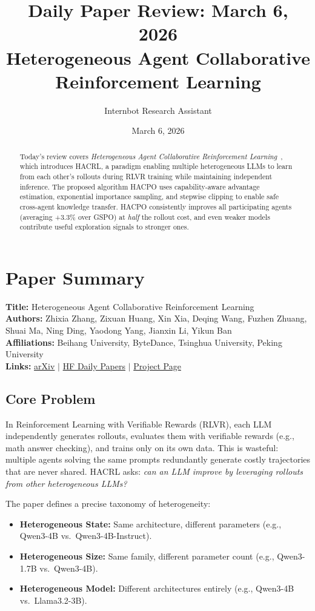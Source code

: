 \documentclass[11pt]{article}
\title{Daily Paper Review: March 6, 2026\\Heterogeneous Agent Collaborative Reinforcement Learning}
\author{Internbot Research Assistant}
\date{March 6, 2026}
\begin{document}
\maketitle

\begin{abstract}
Today's review covers \emph{Heterogeneous Agent Collaborative Reinforcement Learning}~\citep{zhang2026hacrl}, which introduces HACRL, a paradigm enabling multiple heterogeneous LLMs to learn from each other's rollouts during RLVR training while maintaining independent inference. The proposed algorithm HACPO uses capability-aware advantage estimation, exponential importance sampling, and stepwise clipping to enable safe cross-agent knowledge transfer. HACPO consistently improves all participating agents (averaging +3.3\% over GSPO) at \emph{half} the rollout cost, and even weaker models contribute useful exploration signals to stronger ones.
\end{abstract}

\section{Paper Summary}

\textbf{Title:} Heterogeneous Agent Collaborative Reinforcement Learning\\
\textbf{Authors:} Zhixia Zhang, Zixuan Huang, Xin Xia, Deqing Wang, Fuzhen Zhuang, Shuai Ma, Ning Ding, Yaodong Yang, Jianxin Li, Yikun Ban\\
\textbf{Affiliations:} Beihang University, ByteDance, Tsinghua University, Peking University\\
\textbf{Links:}
\href{https://arxiv.org/abs/2603.02604}{arXiv} $\mid$
\href{https://huggingface.co/papers/2603.02604}{HF Daily Papers} $\mid$
\href{https://zzx-peter.github.io/hacrl/}{Project Page}

\subsection{Core Problem}

In Reinforcement Learning with Verifiable Rewards (RLVR), each LLM independently generates rollouts, evaluates them with verifiable rewards (e.g., math answer checking), and trains only on its own data. This is wasteful: multiple agents solving the same prompts redundantly generate costly trajectories that are never shared. HACRL asks: \emph{can an LLM improve by leveraging rollouts from other heterogeneous LLMs?}

The paper defines a precise taxonomy of heterogeneity:
\begin{itemize}
    \item \textbf{Heterogeneous State:} Same architecture, different parameters (e.g., Qwen3-4B vs.\ Qwen3-4B-Instruct).
    \item \textbf{Heterogeneous Size:} Same family, different parameter count (e.g., Qwen3-1.7B vs.\ Qwen3-4B).
    \item \textbf{Heterogeneous Model:} Different architectures entirely (e.g., Qwen3-4B vs.\ Llama3.2-3B).
\end{itemize}
\end{document}
